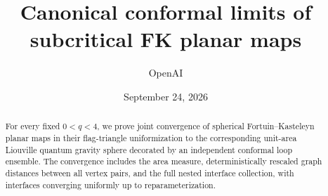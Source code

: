 \documentclass[11pt]{article}
\title{Canonical conformal limits of subcritical FK planar maps}
\author{OpenAI}
\date{September 24, 2026}
\begin{document}
\maketitle
\begin{abstract}
For every fixed $0<q<4$, we prove joint convergence of spherical
Fortuin--Kasteleyn planar maps in their flag-triangle uniformization to
the corresponding unit-area Liouville quantum gravity sphere decorated
by an independent conformal loop ensemble. The convergence includes
the area measure, deterministically rescaled graph distances between all
vertex pairs, and the full nested interface collection, with interfaces
converging uniformly up to reparameterization.
\end{abstract}
\tableofcontents













\let\originalbibsection\bibsection
\renewcommand{\bibsection}{%
  \originalbibsection
  \addcontentsline{toc}{section}{\refname}}

\end{document}
